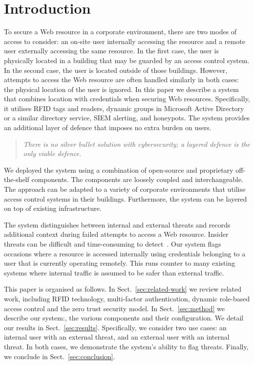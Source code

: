 \section{Introduction}\label{sec:introduction}

To secure a Web resource in a corporate environment, there are two
modes of access to consider: an on-site user internally accessing the
resource and a remote user externally accessing the same resource.  In
the first case, the user is physically located in a building that may
be guarded by an access control system.  In the second case, the user
is located outside of those buildings.  However, attempts to access
the Web resource are often handled similarly in both cases: the
physical location of the user is ignored.  In this paper we describe a
system that combines location with credentials when securing Web
resources.  Specifically, it utilises RFID tags and readers, dynamic
groups in Microsoft Active Directory or a similar directory service,
SIEM alerting, and honeypots.  The system provides an additional layer
of defence that imposes no extra burden on users.

\begin{quote}
  \em{There is no silver bullet solution with cybersecurity; a layered
    defence is the only viable defence.}

\end{quote}

We deployed the system using a combination of open-source and
proprietary off-the-shelf components.  The components are loosely
coupled and interchangeable.  The approach can be adapted to a variety
of corporate environments that utilise access control systems in their
buildings.  Furthermore, the system can be layered on top of existing
infrastructure.

The system distinguishes between internal and external threats and
records additional context during failed attempts to access a Web
resource.  Insider threats can be difficult and time-consuming to
detect~\cite{liu-et-al-18}.  Our system flags occasions where a
resource is accessed internally using credentials belonging to a user
that is currently operating remotely.  This runs counter to many
existing systems where internal traffic is assumed to be safer than
external traffic.

This paper is organised as follows.  In Sect.~\ref{sec:related-work}
we review related work, including RFID technology, multi-factor
authentication, dynamic role-based access control and the zero trust
security model.  In Sect.~\ref{sec:method} we describe our system:,
the various components and their configuration.  We detail our results
in Sect.~\ref{sec:results}.  Specifically, we consider two use cases:
an internal user with an external threat, and an external user with an
internal threat.  In both cases, we demonstrate the system's ability
to flag threats.  Finally, we conclude in Sect.~\ref{sec:conclusion}.
